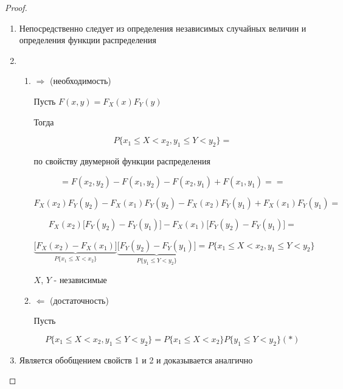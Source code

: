\documentclass[a4paper, 14pt]{report}
\begin{document}
\begin{proof}
    \begin{enumerate}
        \item Непосредственно следует из определения независимых случайных величин и определения функции распределения

        \item

            \begin{enumerate}
                \item $\Rightarrow$ (необходимость)

                    Пусть $F(x,y) = F_X(x)F_Y(y)$

                    Тогда

                    $$
                    P\{ x_1 \le X < x_2, y_1 \le Y < y_2 \} =
                    $$

                    по свойству двумерной функции распределения

                    $$
                    = F(x_2,y_2) - F(x_1, y_2) - F(x_2, y_1) + F(x_1, y_1) = =
                    $$

                    $$
                    F_X(x_2) F_Y(y_2) - F_X(x_1) F_Y(y_2) - F_X (x_2) F_Y(y_1) + F_X(x_1) F_Y(y_1) =
                    $$

                    $$
                    F_X(x_2) \bigg[F_Y(y_2) - F_Y(y_1) \bigg] - F_X (x_1) \bigg[ F_Y(y_2) - F_Y(y_1)\bigg] =
                    $$

                    $$
                    \underbrace{\bigg[F_X(x_2) - F_X(x_1)\bigg]}_{P\{x_1 \le X < x_2\}} \underbrace{\bigg[ F_Y(y_2) - F_Y(y_1) \bigg]}_{P\{y_1 \le Y < y_2\}} = P\{ x_1 \le X < x_2, y_1 \le Y < y_2 \}
                    $$

                    $X$, $Y$ - независимые

                \item $\Leftarrow$ (достаточность)

                    Пусть

                    $$
                    P\{ x_1 \le X < x_2, y_1 \le Y < y_2 \} = P\{ x_1 \le X < x_2 \} P\{y_1 \le Y < y_2\} (*)
                    $$

            \end{enumerate}

        \item Является обобщением свойств 1 и 2 и доказывается аналгично


\end{enumerate}
\end{proof}
\end{document}
